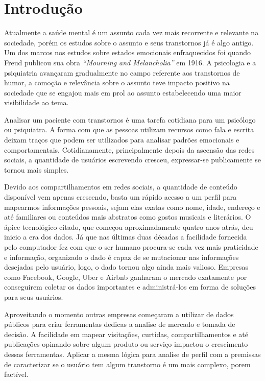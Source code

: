 \chapter*[Introdução]{Introdução}

Atualmente a saúde mental é um assunto cada vez mais recorrente e relevante na sociedade, porém os estudos sobre o assunto e seus transtornos já é algo antigo. Um dos marcos nos estudos sobre estados emocionais enfraquecidos foi quando Freud publicou sua obra \textit{“Mourning and Melancholia”} em 1916. A psicologia e a psiquiatria avançaram gradualmente no campo referente aos transtornos de humor, a comoção e relevância sobre o assunto teve impacto positivo na sociedade que se engajou mais em prol ao assunto estabelecendo uma maior visibilidade ao tema.

Analisar um paciente com transtornos é uma tarefa cotidiana para um psicólogo ou psiquiatra. A forma com que as pessoas utilizam recursos como fala e escrita deixam traços que podem ser utilizados para analisar padrões emocionais e comportamentais. Cotidianamente, principalmente depois da ascensão das redes sociais, a quantidade de usuários escrevendo cresceu, expressar-se publicamente se tornou mais simples.

Devido aos compartilhamentos em redes sociais, a quantidade de conteúdo disponível vem apenas crescendo, basta um rápido acesso a um perfil para mapearmos informações pessoais, sejam elas exatas como nome, idade, endereço e até familiares ou conteúdos mais abstratos como gostos musicais e literários. O ápice tecnológico citado, que começou aproximadamente quatro anos atrás, deu inicio a era dos dados. Já que nas últimas duas décadas a facilidade fornecida pelo computador fez com que o ser humano procura-se cada vez mais praticidade e informação, organizado o dado é capaz de se mutacionar nas informações desejadas pelo usuário, logo, o dado tornou algo ainda mais valioso. Empresas como Facebook, Google, Uber e Airbnb ganharam o mercado exatamente por conseguirem coletar os dados importantes e administrá-los em forma de soluções para seus usuários.

Aproveitando o momento outras empresas começaram a utilizar de dados públicos para criar ferramentas dedicas a analise de mercado e tomada de decisão. A facilidade em mapear visitações, curtidas, compartilhamentos e até publicações opinando sobre algum produto ou serviço impactou o crescimento dessas ferramentas. Aplicar a mesma lógica para analise de perfil com a premissas de caracterizar se o usuário tem algum transtorno é um mais complexo, porem factível.

